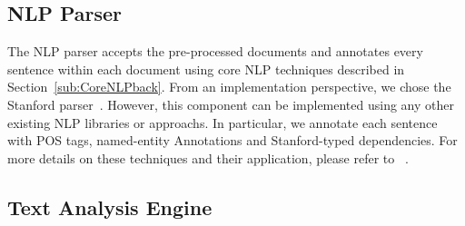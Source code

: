 	
\subsection{NLP Parser}


The NLP parser accepts the pre-processed documents and annotates every sentence within each document using core NLP techniques described in Section~\ref{sub:CoreNLPback}.
From an implementation perspective, we chose the Stanford parser~\cite{Manning:01}.
However, this component can be implemented using any other existing NLP libraries or approachs.
In particular, we annotate each sentence with POS tags, named-entity Annotations and Stanford-typed dependencies.
For more details on these techniques and their application, please refer to ~\cite{Marneffe06LREC, Marneffe08COLING, pandita12:inferring, pandita13:WHYPER, thummalapentaICSE12}.

%

\subsection{Text Analysis Engine}
\label{sub:TAE}
%

